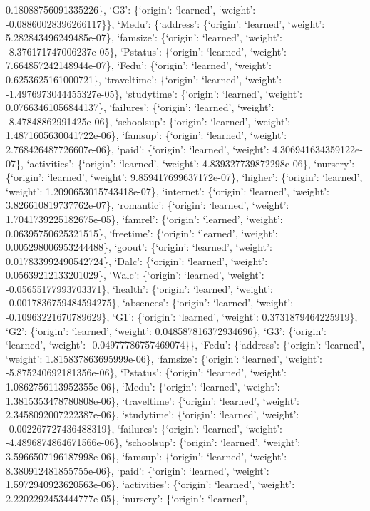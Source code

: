 \documentclass[
]{article}
\begin{document}
0.18088756091335226\}, `G3': \{`origin': `learned', `weight':
-0.08860028396266117\}\}, `Medu': \{`address': \{`origin': `learned',
`weight': 5.282843496249485e-07\}, `famsize': \{`origin': `learned',
`weight': -8.376171747006237e-05\}, `Pstatus': \{`origin': `learned',
`weight': 7.664857242148944e-07\}, `Fedu': \{`origin': `learned',
`weight': 0.6253625161000721\}, `traveltime': \{`origin': `learned',
`weight': -1.4976973044455327e-05\}, `studytime': \{`origin': `learned',
`weight': 0.07663461056844137\}, `failures': \{`origin': `learned',
`weight': -8.47848862991425e-06\}, `schoolsup': \{`origin': `learned',
`weight': 1.4871605630041722e-06\}, `famsup': \{`origin': `learned',
`weight': 2.768426487726607e-06\}, `paid': \{`origin': `learned',
`weight': 4.306941634359122e-07\}, `activities': \{`origin': `learned',
`weight': 4.839327739872298e-06\}, `nursery': \{`origin': `learned',
`weight': 9.859417699637172e-07\}, `higher': \{`origin': `learned',
`weight': 1.2090653015743418e-07\}, `internet': \{`origin': `learned',
`weight': 3.826610819737762e-07\}, `romantic': \{`origin': `learned',
`weight': 1.7041739225182675e-05\}, `famrel': \{`origin': `learned',
`weight': 0.06395750625321515\}, `freetime': \{`origin': `learned',
`weight': 0.005298006953244488\}, `goout': \{`origin': `learned',
`weight': 0.017833992490542724\}, `Dalc': \{`origin': `learned',
`weight': 0.05639212133201029\}, `Walc': \{`origin': `learned',
`weight': -0.05655177993703371\}, `health': \{`origin': `learned',
`weight': -0.0017836759484594275\}, `absences': \{`origin': `learned',
`weight': -0.10963221670789629\}, `G1': \{`origin': `learned', `weight':
0.3731879464225919\}, `G2': \{`origin': `learned', `weight':
0.048587816372934696\}, `G3': \{`origin': `learned', `weight':
-0.04977786757469074\}\}, `Fedu': \{`address': \{`origin': `learned',
`weight': 1.815837863695999e-06\}, `famsize': \{`origin': `learned',
`weight': -5.875240692181356e-06\}, `Pstatus': \{`origin': `learned',
`weight': 1.0862756113952355e-06\}, `Medu': \{`origin': `learned',
`weight': 1.3815353478780808e-06\}, `traveltime': \{`origin': `learned',
`weight': 2.3458092007222387e-06\}, `studytime': \{`origin': `learned',
`weight': -0.002267727436488319\}, `failures': \{`origin': `learned',
`weight': -4.4896874864671566e-06\}, `schoolsup': \{`origin': `learned',
`weight': 3.5966507196187998e-06\}, `famsup': \{`origin': `learned',
`weight': 8.380912481855755e-06\}, `paid': \{`origin': `learned',
`weight': 1.5972940923620563e-06\}, `activities': \{`origin': `learned',
`weight': 2.2202292453444777e-05\}, `nursery': \{`origin': `learned',
\end{document}
